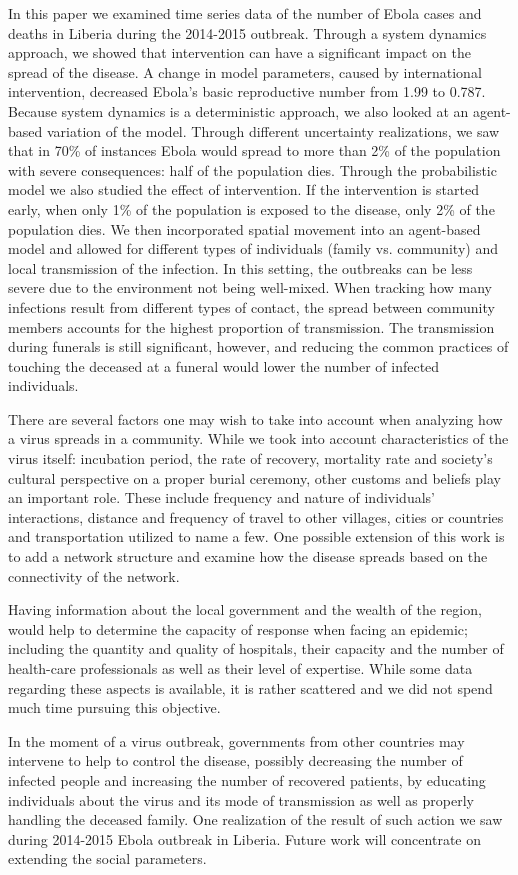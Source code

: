 In this paper we examined time series data of the number of Ebola cases and deaths in Liberia during the 2014-2015 outbreak. Through a system dynamics approach, we showed that intervention can have a significant impact on the spread of the disease. A change in model parameters, caused by international intervention, decreased Ebola's basic reproductive number from 1.99 to 0.787. Because system dynamics is a deterministic approach, we also looked at an agent-based variation of the model. Through different uncertainty realizations, we saw that in 70\% of instances Ebola would spread to more than 2\% of the population with severe consequences: half of the population dies. Through the probabilistic model we also studied the effect of intervention. If the intervention is started early, when only 1\% of the population is exposed to the disease, only 2\% of the population dies. We then incorporated spatial movement into an agent-based model and allowed for different types of individuals (family vs. community) and local transmission of the infection. In this setting, the outbreaks can be less severe due to the environment not being well-mixed. When tracking how many infections result from different types of contact, the spread between community members accounts for the highest proportion of transmission. The transmission during funerals is still significant, however, and reducing the common practices of touching the deceased at a funeral would lower the number of infected individuals.

There are several factors one may wish to take into account when analyzing how a virus spreads in a community. While we took into account characteristics of the virus itself: incubation period, the rate of recovery, mortality rate and society's cultural perspective on a proper burial ceremony, other customs and beliefs play an important role. These include frequency and nature of individuals' interactions, distance and frequency of travel to other villages, cities or countries and transportation utilized to name a few. One possible extension of this work is to add a network structure and examine how the disease spreads based on the connectivity of the network.

Having information about the local government and the wealth of the region, would help to determine the capacity of response when facing an epidemic; including the quantity and quality of hospitals, their capacity and the number of health-care professionals as well as their level of  expertise. While some data regarding these aspects is available, it is rather scattered and we did not spend much time pursuing this objective. 

In the moment of a virus outbreak, governments from other countries may intervene to help to control the disease, possibly decreasing the number of infected people and increasing the number of recovered patients, by educating individuals about the virus and its mode of transmission as well as properly handling the deceased family. One realization of the result of such action we saw during 2014-2015 Ebola outbreak in Liberia. Future work will concentrate on extending the social parameters. 

